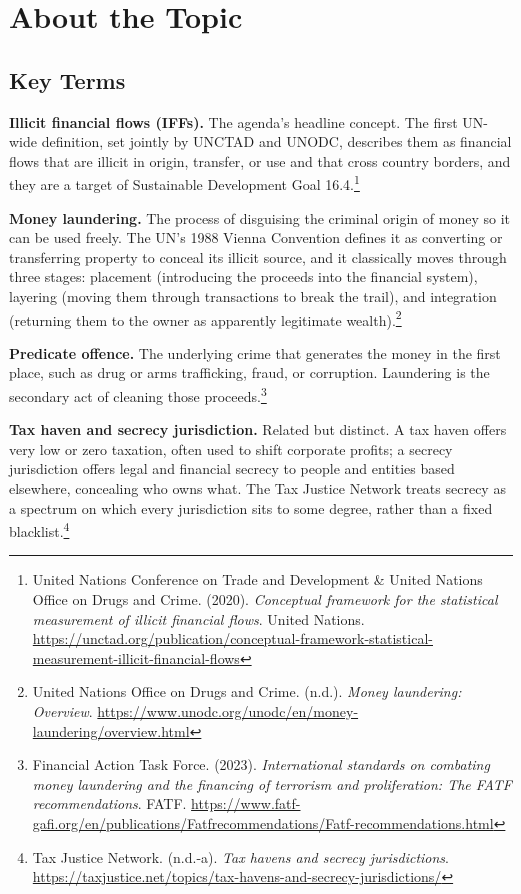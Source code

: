 \section{About the Topic}

\subsection{Key Terms}

\textbf{Illicit financial flows (IFFs).} The agenda’s headline concept. The first UN-wide definition, set jointly by UNCTAD and UNODC, describes them as financial flows that are illicit in origin, transfer, or use and that cross country borders, and they are a target of Sustainable Development Goal 16.4.\footnote{United Nations Conference on Trade and Development \& United Nations Office on Drugs and Crime. (2020). \emph{Conceptual framework for the statistical measurement of illicit financial flows}. United Nations. \url{https://unctad.org/publication/conceptual-framework-statistical-measurement-illicit-financial-flows}}

\textbf{Money laundering.} The process of disguising the criminal origin of money so it can be used freely. The UN’s 1988 Vienna Convention defines it as converting or transferring property to conceal its illicit source, and it classically moves through three stages: placement (introducing the proceeds into the financial system), layering (moving them through transactions to break the trail), and integration (returning them to the owner as apparently legitimate wealth).\footnote{United Nations Office on Drugs and Crime. (n.d.). \emph{Money laundering: Overview}. \url{https://www.unodc.org/unodc/en/money-laundering/overview.html}}

\textbf{Predicate offence.} The underlying crime that generates the money in the first place, such as drug or arms trafficking, fraud, or corruption. Laundering is the secondary act of cleaning those proceeds.\footnote{Financial Action Task Force. (2023). \emph{International standards on combating money laundering and the financing of terrorism and proliferation: The FATF recommendations}. FATF. \url{https://www.fatf-gafi.org/en/publications/Fatfrecommendations/Fatf-recommendations.html}}

\textbf{Tax haven and secrecy jurisdiction.} Related but distinct. A tax haven offers very low or zero taxation, often used to shift corporate profits; a secrecy jurisdiction offers legal and financial secrecy to people and entities based elsewhere, concealing who owns what. The Tax Justice Network treats secrecy as a spectrum on which every jurisdiction sits to some degree, rather than a fixed blacklist.\footnote{Tax Justice Network. (n.d.-a). \emph{Tax havens and secrecy jurisdictions}. \url{https://taxjustice.net/topics/tax-havens-and-secrecy-jurisdictions/}}

